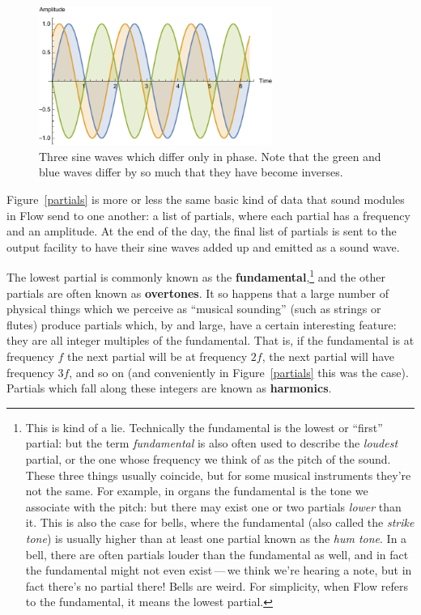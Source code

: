 \documentclass{article}
\newcommand\name{Flow}
\begin{document}
\begin{figure}
\includegraphics[width=3in]{phases}
\caption{Three sine waves which differ only in phase.  Note that the green and blue waves differ by so much that they have become inverses.}
\label{phases}
\vspace{-1em}
\end{figure}

Figure~\ref{partials} is more or less the same basic kind of data that sound modules in {\name} send to one another: a list of partials, where each partial has a frequency and an amplitude.  At the end of the day, the final list of partials is sent to the output facility to have their sine waves added up and emitted as a sound wave.

The lowest partial is commonly known as the {\bf fundamental},\footnote{This is kind of a lie.  Technically the fundamental is the lowest or ``first'' partial: but the term {\it fundamental} is also often used to describe the {\it loudest} partial, or the one whose frequency we think of as the pitch of the sound.  These three things usually coincide, but for some musical instruments they're not the same.  For example, in organs the fundamental is the tone we associate with the pitch: but there may exist one or two partials {\it lower} than it.  This is also the case for bells, where the fundamental (also called the {\it strike tone}) is usually higher than at least one partial known as the {\it hum tone}.  In a bell, there are often partials louder than the fundamental as well, and in fact the fundamental might not even exist\,---\,we think we're hearing a note, but in fact there's no partial there!  Bells are weird.   For simplicity, when {\name} refers to the fundamental, it means the lowest partial.}  and the other partials are often known as {\bf overtones}.  It so happens that a large number of physical things which we perceive as ``musical sounding'' (such as strings or flutes) produce partials which, by and large, have a certain interesting feature: they are all integer multiples of the fundamental.  That is, if the fundamental is at frequency \(f\) the next partial will be at frequency \(2f\), the next partial will have frequency \(3f\), and so on (and conveniently in Figure~\ref{partials} this was the case).  Partials which fall along these integers are known as {\bf harmonics}.  
\end{document}
